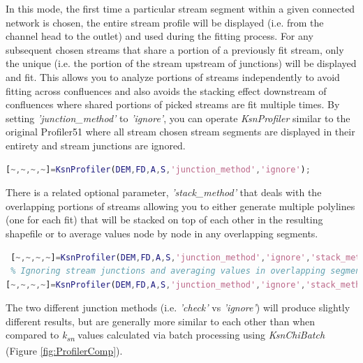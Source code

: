 \noindent
In this mode, the first time a particular stream segment within a given connected network is chosen, the entire stream profile will be displayed (i.e. from the channel head to the outlet) and used during the fitting process. For any subsequent chosen streams that share a portion of a previously fit stream, only the unique (i.e. the portion of the stream upstream of junctions) will be displayed and fit. This allows you to analyze portions of streams independently to avoid fitting across confluences and also avoids the stacking effect downstream of confluences where shared portions of picked streams are fit multiple times. By setting \textit{'junction\_method'} to \textit{'ignore'}, you can operate \textit{KsnProfiler} similar to the original Profiler51 \citep{Wobus2006} where all stream chosen stream segments are displayed in their entirety and stream junctions are ignored.

 \begin{lstlisting}[language=Matlab]
% To run KsnProfiler similar to how Profiler51 operated and fit all selected streams in their entirety:
[~,~,~,~]=KsnProfiler(DEM,FD,A,S,'junction_method','ignore');
\end{lstlisting}

\noindent
 There is a related optional parameter, \textit{'stack\_method'} that deals with the overlapping portions of streams allowing you to either generate multiple polylines (one for each fit) that will be stacked on top of each other in the resulting shapefile or to average values node by node in any overlapping segments. 
 
  \begin{lstlisting}[language=Matlab]
 % Ignoring stream junctions and stacking polylines in output shapefile:
 [~,~,~,~]=KsnProfiler(DEM,FD,A,S,'junction_method','ignore','stack_method','stack');
 % Ignoring stream junctions and averaging values in overlapping segments before producing output shapefile:
[~,~,~,~]=KsnProfiler(DEM,FD,A,S,'junction_method','ignore','stack_method','average');
 \end{lstlisting}
 
 \noindent
 The two different junction methods (i.e. \textit{'check'} vs \textit{'ignore'}) will produce slightly different results, but are generally more similar to each other than when compared to \textit{k\textsubscript{sn}} values calculated via batch processing using \textit{KsnChiBatch} (Figure \ref{fig:ProfilerComp}).


